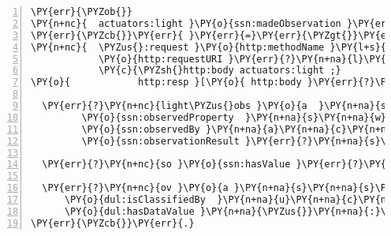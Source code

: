 \expandafter\def\csname PY@tok@err\endcsname{}
\begin{Verbatim}[commandchars=\\\{\},numbers=left,firstnumber=1,stepnumber=1]
\PY{err}{\PYZob{}}
\PY{n+nc}{  actuators:light }\PY{o}{ssn:madeObservation }\PY{err}{?}\PY{n+na}{l}\PY{n+na}{i}\PY{n+na}{g}\PY{n+na}{h}\PY{n+na}{t}\PY{n+na}{\PYZus{}}\PY{n+na}{o}\PY{n+na}{b}\PY{n+na}{s }.
\PY{err}{\PYZcb{}}\PY{err}{ }\PY{err}{=}\PY{err}{\PYZgt{}}\PY{err}{ }\PY{err}{\PYZob{}}
\PY{n+nc}{  \PYZus{}:request }\PY{o}{http:methodName }\PY{l+s}{\PYZdq{}GET\PYZdq{} };
            \PY{o}{http:requestURI }\PY{err}{?}\PY{n+na}{l}\PY{n+na}{i}\PY{n+na}{g}\PY{n+na}{h}\PY{n+na}{t}\PY{n+na}{\PYZus{}}\PY{n+na}{o}\PY{n+na}{b}\PY{n+na}{s };
            \PY{c}{\PYZsh{}http:body actuators:light ;}
\PY{o}{            http:resp }[\PY{o}{ http:body }\PY{err}{?}\PY{n+na}{l}\PY{n+na}{i}\PY{n+na}{g}\PY{n+na}{h}\PY{n+na}{t}\PY{n+na}{\PYZus{}}\PY{n+na}{o}\PY{n+na}{b}\PY{n+na}{s }].
  
  \PY{err}{?}\PY{n+nc}{light\PYZus{}obs }\PY{o}{a  }\PY{n+na}{s}\PY{n+na}{s}\PY{n+na}{n}\PY{n+na}{:}\PY{n+na}{O}\PY{n+na}{b}\PY{n+na}{s}\PY{n+na}{e}\PY{n+na}{r}\PY{n+na}{v}\PY{n+na}{a}\PY{n+na}{t}\PY{n+na}{i}\PY{n+na}{o}\PY{n+na}{n };
         \PY{o}{ssn:observedProperty  }\PY{n+na}{s}\PY{n+na}{w}\PY{n+na}{e}\PY{n+na}{e}\PY{n+na}{t}\PY{n+na}{:}\PY{n+na}{L}\PY{n+na}{i}\PY{n+na}{g}\PY{n+na}{h}\PY{n+na}{t };
         \PY{o}{ssn:observedBy }\PY{n+na}{a}\PY{n+na}{c}\PY{n+na}{t}\PY{n+na}{u}\PY{n+na}{a}\PY{n+na}{t}\PY{n+na}{o}\PY{n+na}{r}\PY{n+na}{s}\PY{n+na}{:}\PY{n+na}{l}\PY{n+na}{i}\PY{n+na}{g}\PY{n+na}{h}\PY{n+na}{t };
         \PY{o}{ssn:observationResult }\PY{err}{?}\PY{n+na}{s}\PY{n+na}{o }.
     
  \PY{err}{?}\PY{n+nc}{so }\PY{o}{ssn:hasValue }\PY{err}{?}\PY{n+na}{o}\PY{n+na}{v }.

  \PY{err}{?}\PY{n+nc}{ov }\PY{o}{a }\PY{n+na}{s}\PY{n+na}{s}\PY{n+na}{n}\PY{n+na}{:}\PY{n+na}{O}\PY{n+na}{b}\PY{n+na}{s}\PY{n+na}{e}\PY{n+na}{r}\PY{n+na}{v}\PY{n+na}{a}\PY{n+na}{t}\PY{n+na}{i}\PY{n+na}{o}\PY{n+na}{n}\PY{n+na}{V}\PY{n+na}{a}\PY{n+na}{l}\PY{n+na}{u}\PY{n+na}{e };
      \PY{o}{dul:isClassifiedBy  }\PY{n+na}{u}\PY{n+na}{c}\PY{n+na}{u}\PY{n+na}{m}\PY{n+na}{:}\PY{n+na}{l}\PY{n+na}{u}\PY{n+na}{x };
      \PY{o}{dul:hasDataValue }\PY{n+na}{\PYZus{}}\PY{n+na}{:}\PY{n+na}{v}\PY{n+na}{a}\PY{n+na}{l }.
\PY{err}{\PYZcb{}}\PY{err}{.}
\end{Verbatim}
